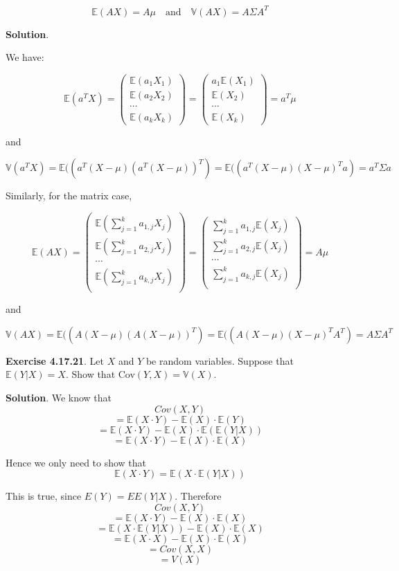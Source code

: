 \[ \mathbb{E}(A X) = A \mu
\quad \text{and} \quad
\mathbb{V}(AX) = A \Sigma A^T \]

\textbf{Solution}.

We have:

\[ \mathbb{E}(a^T X) = \begin{pmatrix}
\mathbb{E}(a_{1} X_{1}) \\
\mathbb{E}(a_{2} X_{2}) \\
\cdots \\
\mathbb{E}(a_{k} X_{k})
\end{pmatrix} = \begin{pmatrix}
a_{1} \mathbb{E}(X_{1}) \\
\mathbb{E}(X_{2}) \\
\cdots \\
\mathbb{E}(X_{k})
\end{pmatrix} = a^T \mu \]

and

\[ \mathbb{V}(a^T X) = \mathbb{E}((a^T (X - \mu) (a^T(X - \mu))^T) = \mathbb{E}((a^T (X - \mu) (X - \mu)^T a) = a^T \Sigma a \]

Similarly, for the matrix case,

\[ \mathbb{E}(AX) = \begin{pmatrix}
\mathbb{E}\left( \sum_{j=1}^{k} a_{1, j} X_{j} \right) \\
\mathbb{E}\left( \sum_{j=1}^{k} a_{2, j} X_{j} \right) \\
\cdots \\
\mathbb{E}\left( \sum_{j=1}^{k} a_{k, j} X_{j} \right) \\
\end{pmatrix} = \begin{pmatrix}
\sum_{j=1}^{k} a_{1, j} \mathbb{E}(X_{j}) \\
\sum_{j=1}^{k} a_{2, j} \mathbb{E}(X_{j}) \\
\cdots \\
\sum_{j=1}^{k} a_{k, j} \mathbb{E}(X_{j}) \\
\end{pmatrix} = A \mu \]

and

\[ \mathbb{V}(A X) = \mathbb{E}((A (X - \mu) (A(X - \mu))^T) = \mathbb{E}((A (X - \mu) (X - \mu)^T A^T) = A \Sigma A^T \]

\textbf{Exercise 4.17.21}. Let \(X\) and \(Y\) be random variables.
Suppose that \(\mathbb{E}(Y|X) = X\). Show that
Cov\((Y, X) = \mathbb{V}(X)\).

\textbf{Solution}. We know that \[Cov(X, Y)\]
\[= \mathbb{E}(X \cdot Y) - \mathbb{E}(X) \cdot \mathbb{E}(Y)\]
\[= \mathbb{E}(X \cdot Y) - \mathbb{E}(X) \cdot \mathbb{E}(\mathbb{E}(Y|X))\]
\[= \mathbb{E}(X\cdot Y) - \mathbb{E}(X) \cdot \mathbb{E}(X)\]

Hence we only need to show that
\[\mathbb{E}(X\cdot Y) = \mathbb{E}(X \cdot \mathbb{E}(Y|X))\]

This is true, since \(E(Y) = EE(Y|X)\). Therefore \[Cov(X, Y)\]
\[= \mathbb{E}(X\cdot Y) -  \mathbb{E}(X) \cdot \mathbb{E}(X)\]
\[= \mathbb{E}(X \cdot \mathbb{E}(Y|X)) -  \mathbb{E}(X) \cdot \mathbb{E}(X)\]
\[= \mathbb{E}(X\cdot X) -  \mathbb{E}(X) \cdot \mathbb{E}(X)\]
\[= Cov(X, X)\] \[= V(X)\]

